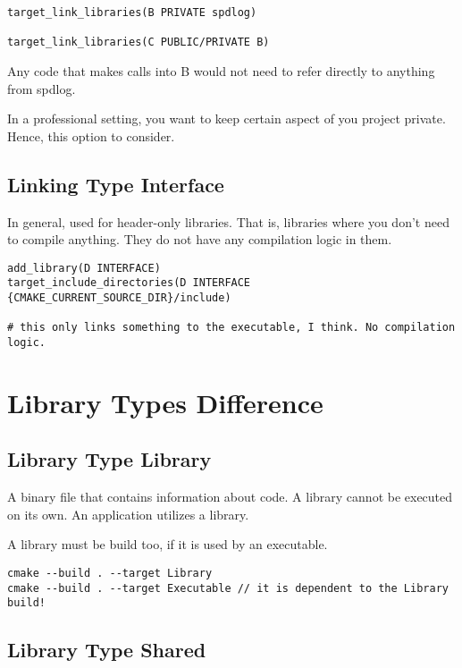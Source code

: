 \begin{verbatim}
target_link_libraries(B PRIVATE spdlog)

target_link_libraries(C PUBLIC/PRIVATE B)
\end{verbatim}

Any code that makes calls into B would not need to refer directly to anything from
spdlog.


In a professional setting, you want to keep certain aspect of you project private. Hence, this option to consider.

\subsection{Linking Type Interface}

In general, used for header-only libraries. That is, libraries where you don't need to compile anything. They do not have
any compilation logic in them.

\begin{verbatim}
add_library(D INTERFACE)
target_include_directories(D INTERFACE {CMAKE_CURRENT_SOURCE_DIR}/include)

# this only links something to the executable, I think. No compilation logic.
\end{verbatim}


\section{Library Types Difference}

\subsection{Library Type Library}

A binary file that contains information about code.
A library cannot be executed on its own.
An application utilizes a library.

A library must be build too, if it is used by an executable.

\begin{verbatim}
cmake --build . --target Library
cmake --build . --target Executable // it is dependent to the Library build!
\end{verbatim}

\subsection{Library Type Shared}

